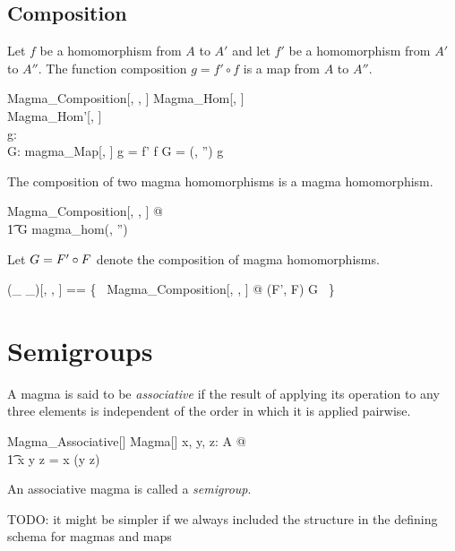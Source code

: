 \documentclass{amsart}
\begin{document}
\subsection{Composition}

Let $f$ be a homomorphism from $A$ to $A'$ and let $f'$ be a homomorphism from $A'$ to $A''$.
The function composition $g = f' \circ f$ is a map from $A$ to $A''$.

\begin{schema}{Magma\_Composition}[\genT, \genU, \genV]
	Magma\_Hom[\genT, \genU] \\
	Magma\_Hom'[\genU, \genV] \\
	g: \genT \pfun \genV  \\
	G: magma\_Map[\genT, \genV]
\where
	g = f' \circ f
\also
	G = (\strucA, \strucA'') \mapsto g
\end{schema}

\begin{remark}
The composition of two magma homomorphisms is a magma homomorphism.
\begin{zed}
	\forall Magma\_Composition[\setT, \setU, \setV] @ \\
	\t1	G \in magma\_hom(\strucA, \strucA'')
\end{zed}
\end{remark}

Let $G = F' \mathbin{\circ} F$ denote the composition of magma homomorphisms.

\begin{zed}
	(\_ \circG \_)[\genT, \genU, \genV] == \{~ Magma\_Composition[\genT, \genU, \genV] @ (F', F) \mapsto G ~\}
\end{zed}

\section{Semigroups}

A magma is said to be \textit{associative} if the result of applying its operation to any three elements
is independent of the order in which it is applied pairwise.

\begin{schema}{Magma\_Associative}[\genT]
	Magma[\genT]
\where
	\forall x, y, z: A @ \\
	\t1	x \opG y \opG z = x \opG (y \opG z)
\end{schema}

An associative magma is called a \textit{semigroup}.

TODO: it might be simpler if we always included the structure in the defining schema for magmas and maps
\end{document}
